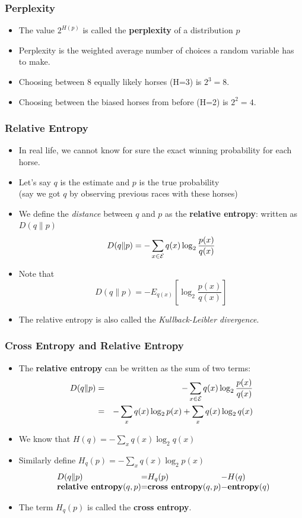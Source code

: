 \documentclass[handout]{beamer}
\begin{document}
\begin{frame}
\frametitle{Perplexity}
\begin{itemize}[<+->]
\item The value $2^{H(p)}$ is called the {\bf perplexity} of a distribution $p$
\item Perplexity is the weighted average number of choices a random
  variable has to make.
\item Choosing between 8 equally likely horses (H=3) is $2^3 = 8$.
\item Choosing between the biased horses from before (H=2) is $2^2 =
  4$. 
\end{itemize}

\end{frame}

\begin{frame}
\frametitle{Relative Entropy}
\begin{itemize}[<+->]
\item In real life, we cannot know for sure the exact winning
  probability for each horse. 
\item Let's say $q$ is the estimate
  and $p$ is the true probability \\
  {\small (say we got $q$ by observing previous races with these horses)}
\item We define the {\em distance} between $q$ and $p$ as the {\bf relative entropy}: written as $D(q \| p)$
\[ D(q \| p) = - \sum_{x \in {\cal E}} q(x) \log_2 \frac{p(x)}{q(x)} \]
\item Note that
\[ D(q \| p) = - E_{ q(x) } \left[ \log_2 \frac{p(x)}{q(x)} \right] \]
\item The relative entropy is also called the {\em Kullback-Leibler divergence}.
\end{itemize}

\end{frame}

\begin{frame}
\frametitle{Cross Entropy and Relative Entropy}
\begin{itemize}[<+->]
\item The {\bf relative entropy} can be written as the sum of two terms:
\begin{eqnarray*}
D(q \| p) & = & - \sum_{x \in {\cal E}} q(x) \log_2 \frac{p(x)}{q(x)} \\
& = & - \sum_{x} q(x) \log_2 p(x) + \sum_{x} q(x) \log_2 q(x) 
\end{eqnarray*}
\item We know that $H(q) = - \sum_{x} q(x) \log_2 q(x)$
\item Similarly define $H_{q}(p) = - \sum_{x} q(x) \log_2 p(x)$
\[
\begin{array}{l@{}c@{}l@{}c@{}l@{}}
D(q \| p) & = & H_{q}(p) & - & H(q) \\
\textbf{relative entropy}(q, p) & = & \textbf{cross entropy}(q, p) & - & \textbf{entropy}(q) 
\end{array}
\]
\item The term $H_{q}(p)$ is called the {\bf cross entropy}.
\end{itemize}

\end{frame}
\end{document}
